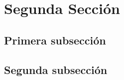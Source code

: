 \documentclass{article}
\begin{document}

\section{Segunda Sección}

	\subsection{Primera subsección}

		\lipsum[1]

	\subsection{Segunda subsección}

		\lipsum[2]
\end{document}
